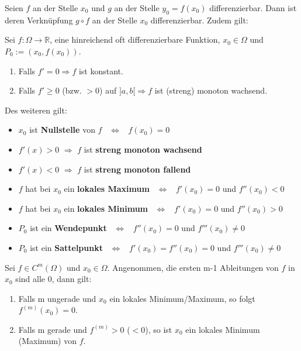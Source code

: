 \begin{theorem}[Kettenregel]
    Seien $f$ an der Stelle $x_0$ und $g$ an der Stelle $y_0 = f(x_0)$ differenzierbar. Dann ist deren Verknüpfung $g \circ f$ an der Stelle $x_0$ differenzierbar. Zudem gilt:
	
	
\end{theorem}

\begin{concept}[Kurvendiskussion]
Sei $f: \Omega \rightarrow \mathbb{R}$, eine hinreichend oft differenzierbare Funktion, $x_0 \in \Omega$ und  $P_0 := (x_0,f(x_0))$.
	\begin{enumerate}
		\item Falls $f'= 0 \Rightarrow f$ ist konstant.
		
        \item Falls $f' \geq 0$ (bzw. $>0$) auf $]a,b[ \Rightarrow f$ ist (streng) monoton wachsend. 
	\end{enumerate}
    
    Des weiteren gilt:
\begin{itemize}
\item $x_0$ ist \textbf{Nullstelle} von $f$ \ $\iff$ \ $f(x_0) = 0$
\item $f'(x) > 0$ $\Rightarrow$ $f$ ist \textbf{streng monoton wachsend}
\item $f'(x) < 0$ $\Rightarrow$ $f$ ist \textbf{streng monoton fallend}
\item $f$ hat bei $x_0$ ein \textbf{lokales Maximum}  \ $\Leftrightarrow$ \ $f'(x_0) = 0$ und $f''(x_0) < 0$
\item $f$ hat bei $x_0$ ein \textbf{lokales Minimum}  \ $\Leftrightarrow$ \ $f'(x_0) = 0$ und $f''(x_0) > 0$
\item $P_0$ ist ein \textbf{Wendepunkt}  \ $\Leftrightarrow$ \ $f''(x_0) = 0$ und $f'''(x_0) \neq 0$
\item $P_0$ ist ein \textbf{Sattelpunkt}  \ $\Leftrightarrow$ \ $f'(x_0) = f''(x_0) = 0$ und $f'''(x_0) \neq 0$\\
\end{itemize}
\end{concept}

\begin{corollary}
Sei $f\in C^m(\Omega)$ und $x_0\in \Omega$. Angenommen, die ersten m-1 Ableitungen von $f$ in $x_0$ sind alle 0, dann gilt:
\begin{enumerate}
\item Falls m ungerade und $x_0$ ein lokales Minimum/Maximum, so folgt $f^{(m)}(x_0)=0$.
\item Falls m gerade und $f^{(m)}>0$ ($< 0$), so ist $x_0$ ein lokales Minimum (Maximum) von $f$.
\end{enumerate}
\end{corollary}

